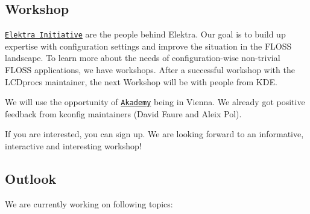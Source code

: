 \subsection*{Workshop}

\href{https://www.libelektra.org/developers/authors}{\tt Elektra Initiative} are the people behind Elektra. Our goal is to build up expertise with configuration settings and improve the situation in the F\+L\+O\+SS landscape. To learn more about the needs of configuration-\/wise non-\/trivial F\+L\+O\+SS applications, we have workshops. After a successful workshop with the L\+C\+Dproc\textquotesingle{}s maintainer, the next Workshop will be with people from K\+DE.

We will use the opportunity of \href{https://akademy.kde.org/2018}{\tt Akademy} being in Vienna. We already got positive feedback from kconfig maintainers (David Faure and Aleix Pol).

If you are interested, you can sign up. We are looking forward to an informative, interactive and interesting workshop!

\subsection*{Outlook}

We are currently working on following topics\+:



